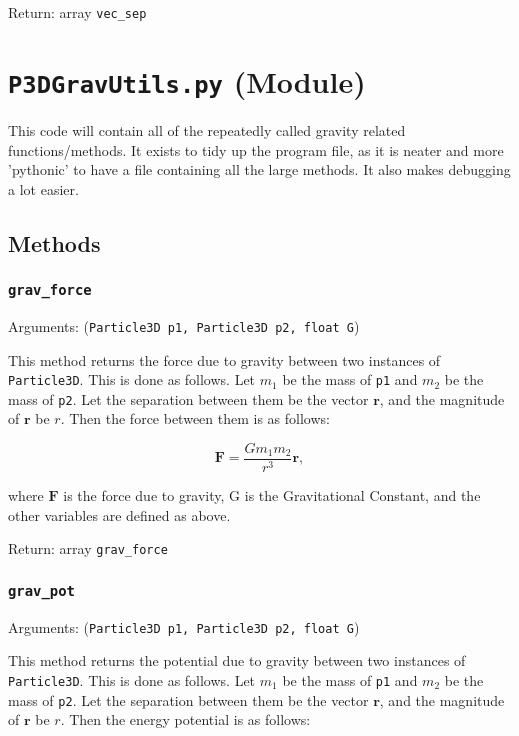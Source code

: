 \documentclass[a4paper, 11pt, british, left=1in, right=1in, top=0.3in, bottom=1in]{article}
\begin{document}
	Return: array \texttt{vec\_sep}	
	
	\pagebreak
	
	\section{\texttt{P3DGravUtils.py} (Module)}
	
	This code will contain all of the repeatedly called gravity related functions/methods. It exists to tidy up the program file, as it is neater and more 'pythonic' to have a file containing all the large methods. It also makes debugging a lot easier. 
	
	\subsection{Methods}
	
	\subsubsection{\texttt{grav\_force}}
	
	Arguments: (\texttt{Particle3D p1, Particle3D p2, float G})
	
	This method returns the force due to gravity between two instances of \texttt{Particle3D}. This is done as follows. Let $m_1$ be the mass of \texttt{p1} and $m_2$ be the mass of \texttt{p2}. Let the separation between them be the vector $\textbf{r}$, and the magnitude of $\textbf{r}$ be $r$. Then the force between them is as follows:
	
	$$\textbf{F} = \frac{Gm_1m_2}{r^3}\textbf{r},$$
	
	where $\textbf{F}$ is the force due to gravity, G is the Gravitational Constant, and the other variables are defined as above. 
	
	Return: array \texttt{grav\_force}
	
	\subsubsection{\texttt{grav\_pot}}
	
	Arguments: (\texttt{Particle3D p1, Particle3D p2, float G})
	
	This method returns the potential due to gravity between two instances of \texttt{Particle3D}. This is done as follows. Let $m_1$ be the mass of \texttt{p1} and $m_2$ be the mass of \texttt{p2}. Let the separation between them be the vector $\textbf{r}$, and the magnitude of $\textbf{r}$ be $r$. Then the energy potential is as follows:
	
\end{document}
